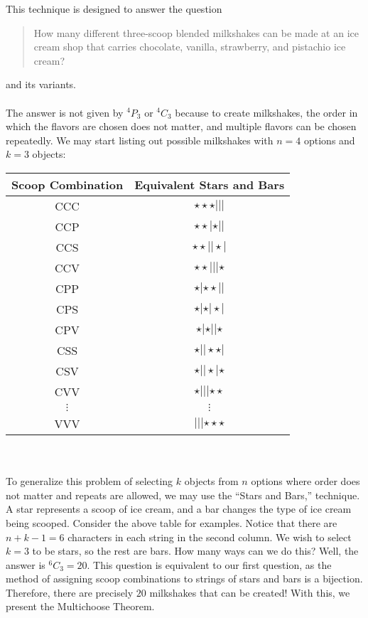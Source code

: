         This technique is designed to answer the question
        \begin{quote}
            How many different three-scoop blended milkshakes can be made at an ice cream shop that carries chocolate, vanilla, strawberry, and pistachio ice cream?
        \end{quote}
        and its variants.
        \\
        \\
        The answer is not given by \(^4P_3\) or \(^4C_3\) because to create milkshakes, the order in which the flavors are chosen does not matter, and multiple flavors can be chosen repeatedly. We may start listing out possible milkshakes with \(n=4\) options and \(k=3\) objects: 
        \begin{center}
            \begin{tabular}{c|c}
            \hline
            Scoop Combination & Equivalent Stars and Bars \\
            \hline
            CCC & \(\star\star\star|||\) \\
            CCP & \(\star\star|\star||\) \\
            CCS & \(\star\star||\star|\) \\
            CCV & \(\star\star|||\star\) \\
            CPP & \(\star|\star\star||\) \\
            CPS & \(\star|\star|\star|\) \\
            CPV & \(\star|\star||\star\) \\
            CSS & \(\star||\star\star|\) \\
            CSV & \(\star||\star|\star\) \\
            CVV & \(\star|||\star\star\) \\
            \(\vdots\) & \(\vdots\) \\
            VVV & \(|||\star\star\star\) \\
            \hline
            \end{tabular}
        \end{center}
        \vphantom
        \\
        \\
        To generalize this problem of selecting \(k\) objects from \(n\) options where order does not matter and repeats are allowed, we may use the ``Stars and Bars,'' technique. A star represents a scoop of ice cream, and a bar changes the type of ice cream being scooped. Consider the above table for examples. Notice that there are \(n+k-1=6\) characters in each string in the second column. We wish to select \(k=3\) to be stars, so the rest are bars. How many ways can we do this? Well, the answer is \(^6C_3=20\). This question is equivalent to our first question, as the method of assigning scoop combinations to strings of stars and bars is a bijection. Therefore, there are precisely \(20\) milkshakes that can be created! With this, we present the Multichoose Theorem.
